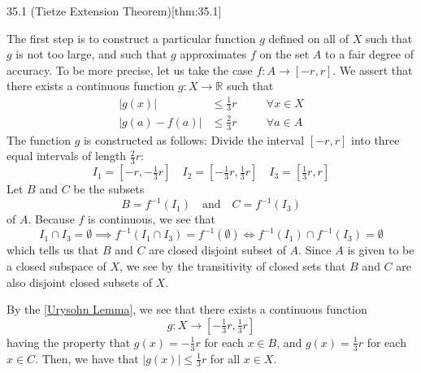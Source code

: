 \begin{thmBox}{35.1 (Tietze Extension Theorem)}[thm:35.1]
\begin{proofBox}
    The first step is to construct a particular function \( g \) defined on all of
    \( X \) such that \( g \) is not too large, and such that \( g \) approximates
    \( f \) on the set \( A \) to a fair degree of accuracy. 
    To be more precise, let us take the case \( f: A \rightarrow [ -r, r ] \). 
    We assert that there exists a continuous function 
    \( g: X \rightarrow \mathbb{R} \) such that 
    \begin{equation*}
        \begin{alignedat}{2}
            \lvert g ( x ) \rvert &\leq \frac{ 1 }{ 3 } r 
            &&\quad \forall x \in X
            \\
            \lvert g ( a ) - f ( a ) \rvert &\leq \frac{ 2 }{ 3 } r 
            &&\quad \forall a \in A 
        \end{alignedat}
    \end{equation*}
    The function \( g \) is constructed as follows: 
    Divide the interval \( [ -r, r ] \) into three equal intervals of length
    \( \frac{ 2 }{ 3 } r \):
    \begin{equation*}
        I_{ 1 }
        =
        [ -r, -\tfrac{ 1 }{ 3 } r ]
        \quad 
        I_{ 2 }
        =
        [ - \tfrac{ 1 }{ 3 }r, \tfrac{ 1 }{ 3 }r ]
        \quad 
        I_{ 3 }
        =
        [ \tfrac{ 1 }{ 3 } r, r ]
    \end{equation*}
    Let \( B \) and \( C \) be the subsets
    \begin{equation*}
        B = f^{ -1 } ( I_{ 1 } )
        \quad \mathrm{and} \quad 
        C = f^{ -1 } ( I_{ 3 } )
    \end{equation*}
    of \( A \). Because \( f \) is continuous, we see that 
    \begin{equation*}
        I_{ 1 } \cap I_{ 3 }
        =
        \emptyset
        \implies
        f^{ -1 } ( I_{ 1 } \cap I_{ 3 } ) = f^{ -1 } ( \emptyset )
        \iff 
        f^{ -1 } ( I_{ 1 } ) \cap f^{ -1 } ( I_{ 3 } ) = \emptyset
    \end{equation*}
    which tells us that \( B \) and \( C \) are closed disjoint subset of \( A \). 
    Since \( A \) is given to be a closed subspace of \( X \), we see by the 
    transitivity of closed sets that \( B \) and \( C \) are also disjoint closed 
    subsets of \( X \). 

    \baseSkip

    By the [\hyperlink{thm33.1}{Urysohn Lemma}], we see that there exists a 
    continuous function 
    \begin{equation*}
        g: X \rightarrow [ - \tfrac{ 1 }{ 3 } r, \tfrac{ 1 }{ 3 } r ]
    \end{equation*}
    having the property that \( g ( x ) = - \frac{ 1 }{ 3 } r \) for each 
    \( x \in B \), and \( g ( x ) = \frac{ 1 }{ 3 } r \) for each \( x \in C \). 
    Then, we have that \( \lvert g ( x ) \rvert \leq \frac{ 1 }{ 3 } r \) for all
    \( x \in X \). 


\end{proofBox}
\end{thmBox}
